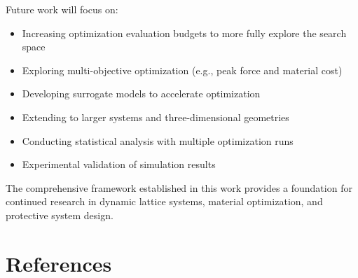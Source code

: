 \documentclass[11pt,a4paper]{article}
\begin{document}
\noindent Future work will focus on:
\begin{itemize}
    \item Increasing optimization evaluation budgets to more fully explore the search space
    \item Exploring multi-objective optimization (e.g., peak force and material cost)
    \item Developing surrogate models to accelerate optimization
    \item Extending to larger systems and three-dimensional geometries
    \item Conducting statistical analysis with multiple optimization runs
    \item Experimental validation of simulation results
\end{itemize}

\noindent The comprehensive framework established in this work provides a foundation for continued research in dynamic lattice systems, material optimization, and protective system design.

\section{References}
\label{sec:references}
\end{document}
